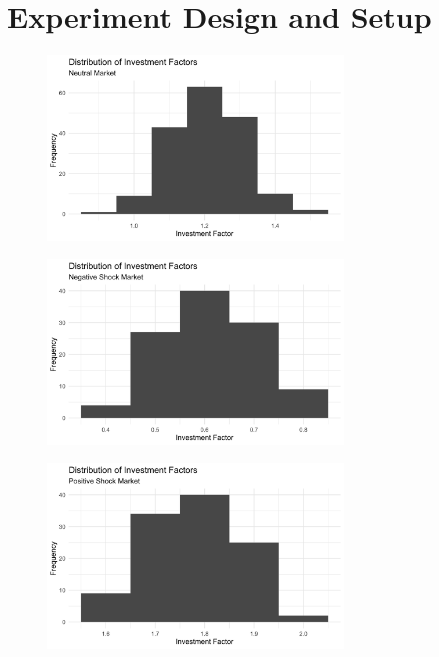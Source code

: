 \documentclass[12pt, a4paper]{article}
\theoremstyle{remark}
\begin{document}
\section{Experiment Design and Setup}

\begin{figure}[H]
	\centering
	\includegraphics[width=0.7\textwidth]{investment-factors-neutral-market-distribution}
\end{figure}

\begin{figure}[H]
	\centering
	\includegraphics[width=0.7\textwidth]{investment-factors-negative-shock-distribution}
\end{figure}

\begin{figure}[H]
	\centering
	\includegraphics[width=0.7\textwidth]{investment-factors-positive-shock-distribution}
\end{figure}
\end{document}
